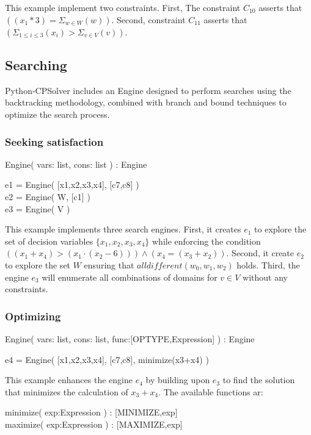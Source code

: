 \documentclass{article}
\newcommand{\cmd}[1] {{\color{teal}  #1}}
\newcommand{\ope}[1] {{\color{purple}#1}}
\newcommand{\definition}[1] {
    \begin{tcolorbox}[colback=white,colframe=mygray,sharp corners=all,top=0.01cm,bottom=0.01cm,left=0.1cm]
        {\fontfamily{pcr}\selectfont #1}
    \end{tcolorbox}
}
\newcommand{\code}[1] {
    \begin{tcolorbox}[colback=mygray,colframe=mygray,sharp corners=all,top=0.01cm,bottom=0.01cm,left=0.1cm]
        \small
        {\fontfamily{pcr}\selectfont
        #1
        }

    \end{tcolorbox}
}
\begin{document}
This example implement two constraints. First, The constraint $C_{10}$ asserts that $((x_1*3) = \Sigma_{w \in W}(w))$. Second, constraint $C_{11}$ asserts that $(\Sigma_{1 \leqslant i \leqslant 3}(x_i) > \Sigma_{v \in V}(v))$.

\subsection{Searching}\label{sec:searching}

Python-CPSolver includes an Engine designed to perform searches using the backtracking methodology, combined with branch and bound techniques to optimize the search process. \\

\subsubsection{Seeking satisfaction}

\definition{ Engine( vars:\cmd{list}, cons:\cmd{list} ) : Engine}

\code{
    e1 \ope{=} Engine( [x1,x2,x3,x4], [c7,c8] )\\
    e2 \ope{=} Engine( W, [c1] ) \\
    e3 \ope{=} Engine( V ) 
}

This example implements three search engines. First, it creates $e_1$ to explore the set of decision variables $\{x_1, x_2, x_3, x_4\}$ while enforcing the condition $((x_1 + x_4) > (x_1 \cdot (x_2 - 6))) \wedge (x_4 = (x_3 + x_2))$.  Second, it create $e_2$ to explore the set $W$
 ensuring that $\textit{alldifferent}(w_0,w_1,w_2)$ holds. Third, the engine $e_3$ will enumerate all combinations of domains for $v \in V$ without any constraints.

\subsubsection{Optimizing}

\definition{ Engine( vars:\cmd{list}, cons:\cmd{list}, func:[OPTYPE,Expression] ) : Engine}

\code{
    e4 \ope{=} Engine( [x1,x2,x3,x4], [c7,c8], minimize(x3+x4) )
}

This example enhances the engine $e_4$ by building upon $e_3$ to find the solution that minimizes the calculation of $x_3+x_4$. The available functions ar:\\

\definition{ 
    minimize( exp:Expression ) : [MINIMIZE,exp] \\
    maximize( exp:Expression ) : [MAXIMIZE,exp]
}
\end{document}
